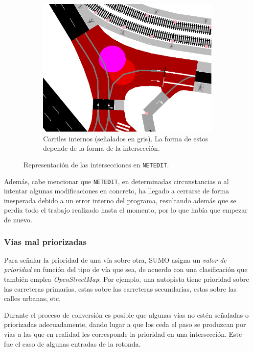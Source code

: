 \begin{figure}[ht]
\begin{subfigure}[t]{.30\textwidth}
    \end{subfigure}%
    \hfill
    \begin{subfigure}[t]{.30\textwidth}
      \centering
      \includegraphics[width=\textwidth]{report/images/interseccion3.png}
      \caption{Carriles internos (señalados en gris). La forma de estos depende de la forma de la intersección.}
      \label{fig:interseccion3}
    \end{subfigure}
    \caption{Representación de las intersecciones en \texttt{NETEDIT}.}
    \label{fig:interseccion}
\end{figure}

Además, cabe mencionar que \texttt{NETEDIT}, en determinadas circunstancias o al intentar algunas modificaciones en concreto, ha llegado a cerrarse de forma inesperada debido a un error interno del programa, resultando además que se perdía todo el trabajo realizado hasta el momento, por lo que había que empezar de nuevo.

\subsubsection{Vías mal priorizadas}

Para señalar la prioridad de una vía sobre otra, SUMO asigna un \textit{valor de prioridad} en función del tipo de vía que sea, de acuerdo con una clasificación que también emplea \textit{OpenStreetMap}. Por ejemplo, una autopista tiene prioridad sobre las carreteras primarias, estas sobre las carreteras secundarias, estas sobre las calles urbanas, etc. 

Durante el proceso de conversión es posible que algunas vías no estén señaladas o priorizadas adecuadamente, dando lugar a que los ceda el paso se produzcan por vías a las que en realidad les corresponde la prioridad en una intersección. Este fue el caso de algunas entradas de la rotonda.

